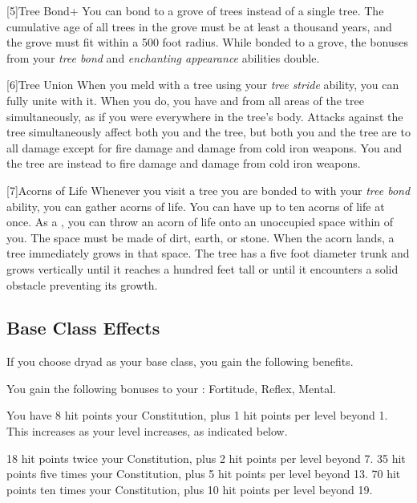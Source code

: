         [5]{Tree Bond+} You can bond to a grove of trees instead of a single tree.
        The cumulative age of all trees in the grove must be at least a thousand years, and the grove must fit within a 500 foot radius.
        While bonded to a grove, the bonuses from your \textit{tree bond} and \textit{enchanting appearance} abilities double.

        [6]{Tree Union} When you meld with a tree using your \textit{tree stride} ability, you can fully unite with it.
        When you do, you have  and  from all areas of the tree simultaneously, as if you were everywhere in the tree's body.
        Attacks against the tree simultaneously affect both you and the tree, but both you and the tree are \impervious to all damage except for fire damage and damage from cold iron weapons.
        You and the tree are instead \vulnerable to fire damage and damage from cold iron weapons.

        [7]{Acorns of Life} Whenever you visit a tree you are bonded to with your \textit{tree bond} ability, you can gather acorns of life.
        You can have up to ten acorns of life at once.
        As a , you can throw an acorn of life onto an unoccupied  space within \medrange of you.
        The space must be made of dirt, earth, or stone.
        When the acorn lands, a tree immediately grows in that space.
        The tree has a five foot diameter trunk and grows vertically until it reaches a hundred feet tall or until it encounters a solid obstacle preventing its growth.

    \subsection{Base Class Effects}
        If you choose dryad as your base class, you gain the following benefits.

        You gain the following bonuses to your :  Fortitude,  Reflex,  Mental.

            You have 8 hit points \add  your Constitution, plus 1 hit points per level beyond 1.
            This increases as your level increases, as indicated below.
            \begin{itemize}
                 18 hit points \add twice your Constitution, plus 2 hit points per level beyond 7.
                 35 hit points \add five times your Constitution, plus 5 hit points per level beyond 13.
                 70 hit points \add ten times your Constitution, plus 10 hit points per level beyond 19.
            \end{itemize}

